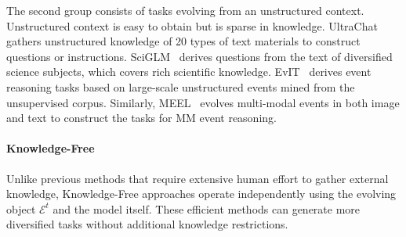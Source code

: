 \documentclass[sn-basic, Numbered]{sn-jnl}%
\def\gE{{\mathcal{E}}}
\theoremstyle{thmstyleone}%
\theoremstyle{thmstyletwo}%
\theoremstyle{thmstylethree}%
\begin{document}
The second group consists of tasks evolving from an unstructured context. Unstructured context is easy to obtain but is sparse in knowledge.
UltraChat~\cite{ding2023enhancing} gathers unstructured knowledge of 20 types of text materials to construct questions or instructions. 
SciGLM~\cite{zhang2024sciglm} derives questions from the text of diversified science subjects, which covers rich scientific knowledge.
EvIT~\cite{tao2024evit} derives event reasoning tasks based on large-scale unstructured events mined from the unsupervised corpus.
Similarly, MEEL~\cite{tao2024meel} evolves multi-modal events in both image and text to construct the tasks for MM event reasoning.






\noindent\paragraph{Knowledge-Free}
Unlike previous methods that require extensive human effort to gather external knowledge, Knowledge-Free approaches operate independently using the evolving object $\gE^{t}$ and the model itself. These efficient methods can generate more diversified tasks without additional knowledge restrictions.
\end{document}
